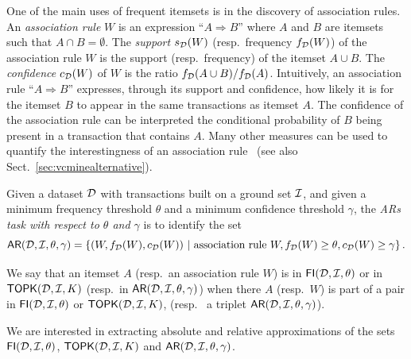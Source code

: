 One of the main uses of frequent itemsets is in the discovery of
association rules.
An \emph{association rule} $W$ is an expression
  ``$A\Rightarrow B$'' where $A$ and $B$ are itemsets such that $A\cap
  B=\emptyset$. The \emph{support} $s_{\cal D}(W)$ (resp.~frequency $f_{\cal D}(W)$)
  of the association rule $W$ is the support (resp.~frequency) of the itemset
  $A\cup B$. The \emph{confidence} $c_{\cal D}(W)$ of $W$ is the ratio $f_{\cal D}(A \cup
  B)/f_{\cal D}(A)$. %
Intuitively, an association rule ``$A\Rightarrow B$'' expresses, through its
support and confidence, how likely it is for the itemset $B$ to appear in the
same transactions as itemset $A$. The confidence of the association rule
can be interpreted the conditional probability of $B$ being present in a transaction that 
contains $A$. Many other measures can be used to quantify the interestingness of
an association rule~\citep{TanKS04} (see also Sect.~\ref{sec:vcminealternative}).

\begin{definition}\label{def:vcmineminear}
  Given a dataset ${\cal D}$ with transactions
  built on a ground set ${\cal I}$, and given a minimum frequency threshold $\theta$
  and a minimum confidence threshold $\gamma$, the \emph{ARs task with respect
  to $\theta$ and $\gamma$} is to identify the set
  \[
  \mathsf{AR}({\cal D},{\cal I},\theta,\gamma)=\left\{(W,f_{\cal D}(W),c_{\cal D}(W)) ~|~ \mbox{association rule } W,
  f_{\cal D}(W)\ge\theta, c_{\cal D}(W)\ge\gamma\right\}.\]
\end{definition}

We say that an itemset $A$ (resp.~an
association rule $W$) is in $\mathsf{FI}({\cal D},{\cal I},\theta)$ or in $\mathsf{TOPK}({\cal D},{\cal I},K)$
(resp.~in $\mathsf{AR}({\cal D},{\cal I},\theta,\gamma)$) 
when there $A$ (resp.~$W$) is part of a pair in $\mathsf{FI}({\cal D},{\cal I},\theta)$ or
$\mathsf{TOPK}({\cal D},{\cal I},K)$, (resp.~ a triplet $\mathsf{AR}({\cal D},{\cal I},\theta,\gamma)$).

We are interested in extracting absolute and relative
approximations of the sets $\mathsf{FI}({\cal D},{\cal I},\theta)$, $\mathsf{TOPK}({\cal D},{\cal I},K)$ and
$\mathsf{AR}({\cal D},{\cal I},\theta,\gamma)$. 

